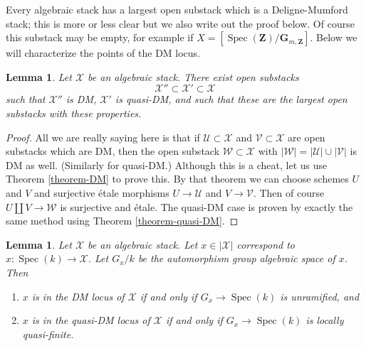 \documentclass{stacks-project}
\theoremstyle{plain}
\newtheorem{lemma}[subsection]{Lemma}
\theoremstyle{definition}
\theoremstyle{remark}
\numberwithin{equation}{subsection}
\def\Spec{\mathop{\mathrm{Spec}}}
\begin{document}
\noindent
Every algebraic stack has a largest open substack which is a
Deligne-Mumford stack; this is more or less clear but we also
write out the proof below. Of course this substack may be empty,
for example if $X = [\Spec(\mathbf{Z})/\mathbf{G}_{m, \mathbf{Z}}]$.
Below we will characterize the points of the DM locus.

\begin{lemma}
\label{lemma-open-DM-locus}
Let $\mathcal{X}$ be an algebraic stack. There exist open substacks
$$
\mathcal{X}'' \subset \mathcal{X}' \subset \mathcal{X}
$$
such that $\mathcal{X}''$ is DM, $\mathcal{X}'$ is quasi-DM, and
such that these are the largest open substacks with these properties.
\end{lemma}

\begin{proof}
All we are really saying here is that if $\mathcal{U} \subset \mathcal{X}$
and $\mathcal{V} \subset \mathcal{X}$ are open substacks which are DM,
then the open substack $\mathcal{W} \subset \mathcal{X}$
with $|\mathcal{W}| = |\mathcal{U}| \cup |\mathcal{V}|$
is DM as well. (Similarly for quasi-DM.) Although this is a cheat, let
us use Theorem \ref{theorem-DM} to prove this.
By that theorem we can choose
schemes $U$ and $V$ and surjective \'etale morphisms
$U \to \mathcal{U}$ and $V \to \mathcal{V}$.
Then of course $U \amalg V \to \mathcal{W}$ is surjective and \'etale.
The quasi-DM case is proven by exactly the same method using
Theorem \ref{theorem-quasi-DM}.
\end{proof}

\begin{lemma}
\label{lemma-points-DM-locus}
Let $\mathcal{X}$ be an algebraic stack. Let $x \in |\mathcal{X}|$
correspond to $x : \Spec(k) \to \mathcal{X}$. Let $G_x/k$
be the automorphism group algebraic space of $x$. Then
\begin{enumerate}
\item  $x$ is in the DM locus of $\mathcal{X}$
if and only if $G_x \to \Spec(k)$ is unramified, and
\item $x$ is in the quasi-DM locus of $\mathcal{X}$
if and only if $G_x \to \Spec(k)$ is locally quasi-finite.
\end{enumerate}
\end{lemma}
\end{document}
